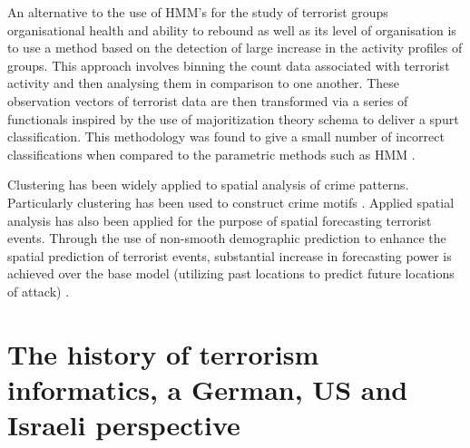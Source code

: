 An alternative to the use of HMM's for the study of terrorist groups organisational health and ability to rebound as well as its level of organisation is to use a method based on the detection of large increase in the activity profiles of groups. This approach involves binning the count data associated with terrorist activity and then analysing them in comparison to one another. These observation vectors of terrorist data are then transformed via a series of functionals inspired by the use of majoritization theory schema to deliver a spurt classification. This methodology was found to give a small number of incorrect classifications when compared to the parametric methods such as HMM \citep{raghavan2016tracking}. 

Clustering has been widely applied to spatial analysis of crime patterns. Particularly clustering has been used to construct crime motifs \citep{nath2006crime}. Applied spatial analysis has also been applied for the purpose of spatial forecasting terrorist events. Through the use of non-smooth demographic prediction to enhance the spatial prediction of terrorist events, substantial  increase in forecasting power is achieved over the base model (utilizing past locations to predict future locations of attack) \citep{brown2004spatial}.

\section{The history of terrorism informatics, a German, US and Israeli perspective}

